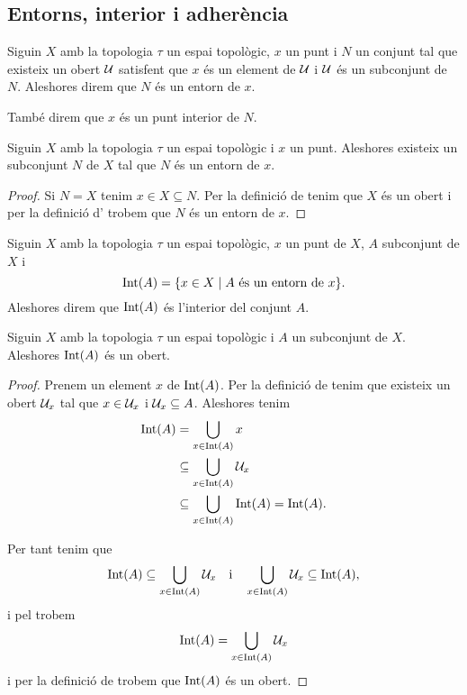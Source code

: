 \documentclass[../Apunts.tex]{subfiles}
\begin{document}
	\subsection{Entorns, interior i adherència}
	\begin{definition}[Entorn]
		\label{def:entorn}
		\label{def:punt interior}
		Siguin \(X\) amb la topologia \(\tau\) un espai topològic, \(x\) un punt i \(N\) un conjunt tal que existeix un obert \(\mathcal{U}\) satisfent que \(x\) és un element de \(\mathcal{U}\) i \(\mathcal{U}\) és un subconjunt de \(N\). Aleshores direm que \(N\) és un entorn de \(x\).
		
		També direm que \(x\) és un punt interior de \(N\).
	\end{definition}
	\begin{observation}
		\label{obs:tot punt té un entorn}
		Siguin \(X\) amb la topologia \(\tau\) un espai topològic i \(x\) un punt. Aleshores existeix un subconjunt \(N\) de \(X\) tal que \(N\) és un entorn de \(x\).
		\begin{proof}
			Si \(N=X\) tenim \(x\in X\subseteq N\). Per la definició de  tenim que \(X\) és un obert i per la definició d' trobem que \(N\) és un entorn de \(x\).
		\end{proof}
	\end{observation}
	\begin{definition}[Interior]
		\label{def:interior}
		Siguin \(X\) amb la topologia \(\tau\) un espai topològic, \(x\) un punt de \(X\), \(A\) subconjunt de \(X\) i
		\[\operatorname{Int}(A)=\{x\in X\mid A\text{ és un entorn de }x\}.\]
		Aleshores direm que \(\operatorname{Int}(A)\) és l'interior del conjunt \(A\).
	\end{definition}
	\begin{proposition}
		\label{prop:l'interior d'un conjunt és un obert}
		Siguin \(X\) amb la topologia \(\tau\) un espai topològic i \(A\) un subconjunt de \(X\). Aleshores \(\operatorname{Int}(A)\) és un obert.
		\begin{proof}
			Prenem un element \(x\) de \(\operatorname{Int}(A)\). Per la definició de  tenim que existeix un obert \(\mathcal{U}_{x}\) tal que \(x\in\mathcal{U}_{x}\) i \(\mathcal{U}_{x}\subseteq A\). Aleshores tenim
			\begin{align*}
				\operatorname{Int}(A)&=\bigcup_{x\in\operatorname{Int}(A)}x \\
				&\subseteq\bigcup_{x\in\operatorname{Int}(A)}\mathcal{U}_{x} \\
				&\subseteq\bigcup_{x\in\operatorname{Int}(A)}\operatorname{Int}(A)=\operatorname{Int}(A).
			\end{align*}
			
			Per tant tenim que
			\[\operatorname{Int}(A)\subseteq\bigcup_{x\in\operatorname{Int}(A)}\mathcal{U}_{x}\quad\text{i}\quad\bigcup_{x\in\operatorname{Int}(A)}\mathcal{U}_{x}\subseteq\operatorname{Int}(A),\]
			i pel  trobem
			\[\operatorname{Int}(A)=\bigcup_{x\in\operatorname{Int}(A)}\mathcal{U}_{x}\]
			i per la definició de  trobem que \(\operatorname{Int}(A)\) és un obert.
		\end{proof}
	\end{proposition}
\end{document}
